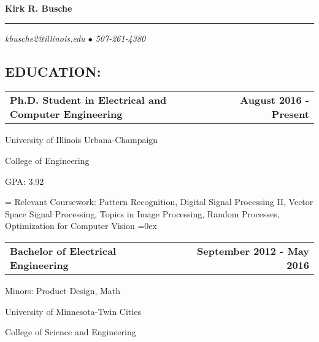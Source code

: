 \documentclass[10pt, letterpaper]{article}
\makeatletter
\newcommand{\headerrow}[2]
{\begin{tabular*}{\linewidth}{l@{\extracolsep{\fill}}r}
	#1 &
	#2 \\
\end{tabular*}}
\newcommand{\sansserif}{\cabin}
\makeatother
\begin{document}
{\sansserif \LARGE \textbf{Kirk R. Busche}}

\rule{\textwidth}{0.5ex}
\vspace{-2em}
\begin{center}
	{\sansserif\small \textit{kbusche2@illinois.edu $\bullet$ 507-261-4380}}
\end{center}

\subsection*{\sansserif EDUCATION:}
\headerrow
	{\textbf{Ph.D. Student in Electrical and Computer Engineering}}
	{\textbf{August 2016 - Present}}

University of Illinois Urbana-Champaign

College of Engineering

GPA: 3.92

\newlength{\mylength}
\settowidth{\mylength}{Relevant Courseworks:}
\hangindent=\mylength
Relevant Coursework: Pattern Recognition, Digital Signal Processing II, Vector Space Signal Processing, Topics in Image Processing, Random Processes, Optimization for Computer Vision
\hangindent=0ex
\\

\begin{comment}
\headerrow
	{\textbf{Master of Science in Electrical and Computer Engineering}}
	{\textbf{Expected May 2018}}

University of Illinois Urbana-Champaign

College of Engineering

GPA: 3.92

\newlength{\mylength}
\settowidth{\mylength}{Relevant Courseworks:}
\hangindent=\mylength
Relevant Coursework: Pattern Recognition, Digital Signal Processing II, Vector Space Signal Processing, Topics in Image Processing, Random Processes, Optimization for Computer Vision
\hangindent=0ex
\\
\end{comment}

\headerrow
	{\textbf{Bachelor of Electrical Engineering}}
	{\textbf{September 2012 - May 2016}}

Minors: Product Design, Math

University of Minnesota-Twin Cities

College of Science and Engineering
\end{document}
